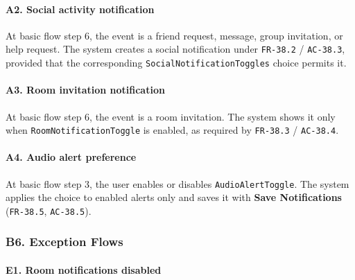 \documentclass[12pt]{article}
\begin{document}
\hypertarget{sec:a2-social-activity-notification}{}
\paragraph*{A2. Social activity notification}
\par\medskip

At basic flow step 6, the event is a friend request, message, group invitation, or help request. The system creates a social notification under \texttt{FR-38.2} / \texttt{AC-38.3}, provided that the corresponding \texttt{SocialNotificationToggles} choice permits it.
\par\medskip

\hypertarget{sec:a3-room-invitation-notification}{}
\paragraph*{A3. Room invitation notification}
\par\medskip

At basic flow step 6, the event is a room invitation. The system shows it only when \texttt{RoomNotificationToggle} is enabled, as required by \texttt{FR-38.3} / \texttt{AC-38.4}.
\par\medskip

\hypertarget{sec:a4-audio-alert-preference}{}
\paragraph*{A4. Audio alert preference}
\par\medskip

At basic flow step 3, the user enables or disables \texttt{AudioAlertToggle}. The system applies the choice to enabled alerts only and saves it with \textbf{Save Notifications} (\texttt{FR-38.5}, \texttt{AC-38.5}).
\par\medskip

\hypertarget{sec:b6-exception-flows}{}
\subsubsection*{B6. Exception Flows}
\par\medskip

\hypertarget{sec:e1-room-notifications-disabled}{}
\paragraph*{E1. Room notifications disabled}
\par\medskip
\end{document}
